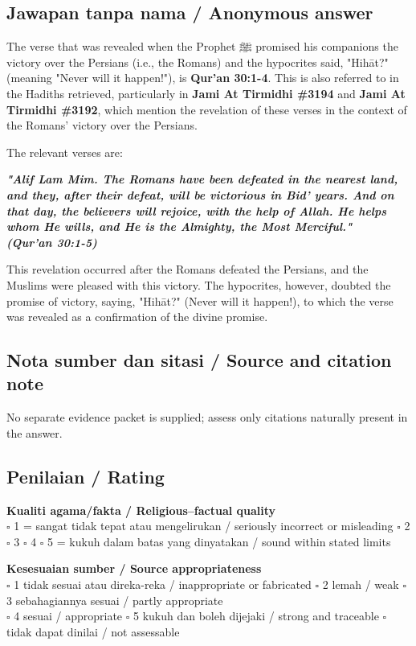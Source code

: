 \documentclass[11pt,a4paper]{article}
\newcommand{\ar}[1]{{\arabicfont #1}}
\begin{document}
\subsection*{Jawapan tanpa nama / Anonymous answer}
The verse that was revealed when the Prophet \ar{ﷺ} promised his companions the victory over the Persians (i.e., the Romans) and the hypocrites said, "Hihāt?" (meaning "Never will it happen!"), is \textbf{Qur'an 30:1-4}. This is also referred to in the Hadiths retrieved, particularly in \textbf{Jami At Tirmidhi \#3194} and \textbf{Jami At Tirmidhi \#3192}, which mention the revelation of these verses in the context of the Romans' victory over the Persians.\par\medskip The relevant verses are:\par\medskip \emph{\textbf{"Alif Lam Mim. The Romans have been defeated in the nearest land, and they, after their defeat, will be victorious in Bid' years. And on that day, the believers will rejoice, with the help of Allah. He helps whom He wills, and He is the Almighty, the Most Merciful."}}\\ \emph{\textbf{(Qur'an 30:1-5)}}\par\medskip This revelation occurred after the Romans defeated the Persians, and the Muslims were pleased with this victory. The hypocrites, however, doubted the promise of victory, saying, "Hihāt?" (Never will it happen!), to which the verse was revealed as a confirmation of the divine promise.

\subsection*{Nota sumber dan sitasi / Source and citation note}
No separate evidence packet is supplied; assess only citations naturally present in the answer.

\subsection*{Penilaian / Rating}
\textbf{Kualiti agama/fakta / Religious--factual quality}\\
$\square$ 1 = sangat tidak tepat atau mengelirukan / seriously incorrect or misleading \quad
$\square$ 2 \quad $\square$ 3 \quad $\square$ 4 \quad
$\square$ 5 = kukuh dalam batas yang dinyatakan / sound within stated limits

\medskip
\textbf{Kesesuaian sumber / Source appropriateness}\\
$\square$ 1 tidak sesuai atau direka-reka / inappropriate or fabricated \quad
$\square$ 2 lemah / weak \quad $\square$ 3 sebahagiannya sesuai / partly appropriate\\
$\square$ 4 sesuai / appropriate \quad $\square$ 5 kukuh dan boleh dijejaki / strong and traceable \quad
$\square$ tidak dapat dinilai / not assessable
\end{document}

